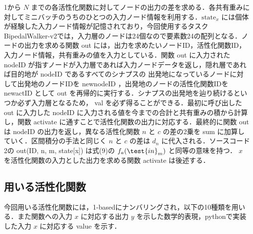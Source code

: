 1から $ N $ までの各活性化関数に対してノードの出力の差を求める．各共有重みに対してミニバッチのうちのひとつの入力ノード情報を利用する．$ \text{state}_x $ には個体が経験した入力ノード情報が記憶されており，今回使用するタスクBipedalWalker-v2では，入力層のノードは24個なので要素数24の配列となる\cite{OpenAI}．ノードの出力を求める関数 out には，出力を求めたいノードID，活性化関数ID，入力ノード情報，共有重みの値を入力としている．関数 out に入力された nodeID が指すノードが入力層であれば入力ノードデータを返し，隠れ層であれば目的地が nodeID であるすべてのシナプスの 出発地になっているノードに対して出発地のノードIDを newnodeID ，出発地のノードの活性化関数IDを newactID として out を再帰的に実行する．シナプスの出発地を辿り続けるといつか必ず入力層となるため， val を必ず得ることができる．最初に呼び出した out に入力した nodeID に入力される値を今までの合計と共有重みの積から計算し，関数 activate に通すことで活性化関数の出力に対応する．最終的に関数 out は nodeID の出力を返し，異なる活性化関数 $ n $ と $ c $ の差の2乗を sum に加算していく．区間積分の手法と同じく $ n $ と $ c $ の差は $ d_n $ に代入される．ソースコード2の out(ID, n, m, state[x]) は式(9)の $ f_{a}(\test{in}_{m}) $ と同等の意味を持つ． $ x $ を活性化関数の入力とした出力を求める関数 activate は後述する．

\clearpage
\subsection{用いる活性化関数}
今回用いる活性化関数には，1-basedにナンバリングされ，以下の10種類を用いる．また関数への入力 $ x $ に対応する出力 $ y $ を示した数学的表現，pythonで実装した入力 $ x $ に対応する value を示す．

